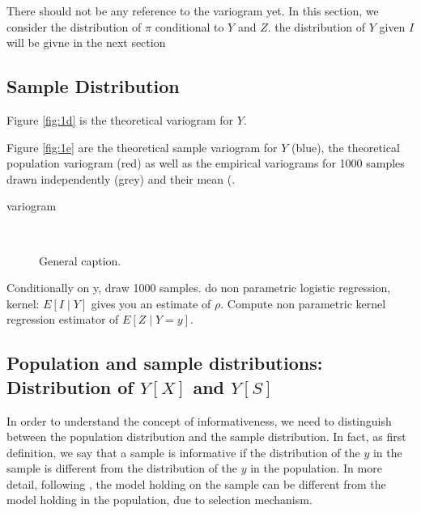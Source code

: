 \documentclass[12pt]{article}
\theoremstyle{definition}
\theoremstyle{remark}
\newcommand{\Sample}{S}
\newcommand{\Signal}{Y}
\begin{document}
{\color{red} There should not be any reference to the variogram yet. In this section, we consider the distribution of $\pi$ conditional to $Y$ and $Z$. the distribution of $Y$ given $I$ will be givne in the next section}



\subsection{Sample Distribution}

Figure \ref{fig:1d} is the theoretical variogram for $\Signal$.

Figure \ref{fig:1e} are the theoretical sample variogram for $\Signal$ (blue), the theoretical population variogram (red) as well as the empirical variograms for 1000 samples drawn independently (grey) and their mean (.

variogram 


\begin{figure}[H]
\centering
\subfigure[Population.]{

}\label{fig:1a}
\label{fig:1b}
\label{fig:1c}
\\


\subfigure[1000 Variograms $C$.] {

}\label{fig:1d}
\subfigure[Variogram $C$.]{

}\label{fig:1e}

\caption{General caption.} \label{fig:1}


\end{figure}

Conditionally on y, draw 1000 samples.
do non parametric logistic regression,
kernel: $E[I\mid Y]$ gives you an estimate of $\rho$.
Compute non parametric kernel regression estimator of $E[Z\mid Y=y]$.

\subsection{Population and sample distributions: Distribution of $\Signal[X]$ and $\Signal[\Sample]$} 
In order to understand the concept of informativeness, we need to distinguish between the population distribution and the sample distribution. In fact, as first definition, we say that a sample is informative if the distribution of the $y$ in the sample is different from the distribution of the $y$ in the population. In more detail, following \cite{pfefferman_1992}, the model holding on the sample can be different from the model holding in the population, due to selection mechanism.
\end{document}
